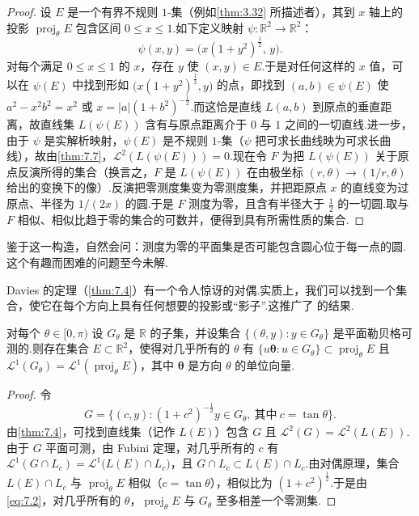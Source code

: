 \begin{proof}
设 $E$ 是一个有界不规则 $1$-集（例如\cref{thm:3.32} 所描述者），其到 $x$ 轴上的投影 $\operatorname{proj}_{\theta}E$ 包含区间 $0\leq x\leq 1$.如下定义映射 $\psi:\mathbb{R}^2\to\mathbb{R}^2$：
\[
  \psi(x,y)=\bigl(x(1+y^{2})^{\frac{1}{2}},\,y\bigr).
\]
对每个满足 $0\leq x\leq 1$ 的 $x$，存在 $y$ 使 $(x,y)\in E$.于是对任何这样的 $x$ 值，可以在 $\psi(E)$ 中找到形如 $\bigl(x(1+y^2)^{\frac{1}{2}},y\bigr)$ 的点，即找到 $(a,b)\in\psi(E)$ 使 $a^2-x^2b^2=x^2$ 或 $x=|a|(1+b^2)^{-\frac{1}{2}}$.而这恰是直线 $L(a,b)$ 到原点的垂直距离，故直线集 $L(\psi(E))$ 含有与原点距离介于 $0$ 与 $1$ 之间的一切直线.进一步，由于 $\psi$ 是实解析映射，$\psi(E)$ 是不规则 $1$-集（$\psi$ 把可求长曲线映为可求长曲线），故由\cref{thm:7.7}，$\mathscr{L}^2(L(\psi(E)))=0$.现在令 $F$ 为把 $L(\psi(E))$ 关于原点反演所得的集合（换言之，$F$ 是 $L(\psi(E))$ 在由极坐标 $(r,\theta)\to(1/r,\theta)$ 给出的变换下的像）.反演把零测度集变为零测度集，并把距原点 $x$ 的直线变为过原点、半径为 $1/(2x)$ 的圆.于是 $F$ 测度为零，且含有半径大于 $\frac{1}{2}$ 的一切圆.取与 $F$ 相似、相似比趋于零的集合的可数并，便得到具有所需性质的集合.
\end{proof}

鉴于这一构造，自然会问：测度为零的平面集是否可能包含圆心位于每一点的圆.这个有趣而困难的问题至今未解.

Davies 的定理（\cref{thm:7.4}）有一个令人惊讶的对偶.实质上，我们可以找到一个集合，使它在每个方向上具有任何想要的投影或``影子''.这推广了 \textcite{talagrand1980} 的结果.

\begin{theorem}\label{thm:7.11}
对每个 $\theta\in[0,\pi)$ 设 $G_\theta$ 是 $\mathbb{R}$ 的子集，并设集合 $\{(\theta,y):y\in G_\theta\}$ 是平面勒贝格可测的.则存在集合 $E\subset\mathbb{R}^2$，使得对几乎所有的 $\theta$ 有 $\{u\boldsymbol{\theta}:u\in G_\theta\}\subset\operatorname{proj}_{\theta}E$ 且 $\mathscr{L}^1(G_\theta)=\mathscr{L}^1(\operatorname{proj}_{\theta}E)$，其中 $\boldsymbol{\theta}$ 是方向 $\theta$ 的单位向量.
\end{theorem}

\begin{proof}
令
\begin{equation}\label{eq:7.2}
  G=\bigl\{(c,y):(1+c^{2})^{-\frac{1}{2}}y\in G_{\theta},\ \text{其中}\ c=\tan\theta\bigr\}.
\end{equation}
由\cref{thm:7.4}，可找到直线集（记作 $L(E)$）包含 $G$ 且 $\mathscr{L}^2(G)=\mathscr{L}^2(L(E))$.由于 $G$ 平面可测，由 Fubini 定理，对几乎所有的 $c$ 有 $\mathscr{L}^1(G\cap L_c)=\mathscr{L}^1\bigl(L(E)\cap L_c\bigr)$，且 $G\cap L_c\subset L(E)\cap L_c$.由对偶原理，集合 $L(E)\cap L_c$ 与 $\operatorname{proj}_{\theta}E$ 相似（$c=\tan\theta$），相似比为 $(1+c^2)^{\frac{1}{2}}$.于是由 \eqref{eq:7.2}，对几乎所有的 $\theta$，$\operatorname{proj}_{\theta}E$ 与 $G_\theta$ 至多相差一个零测集.
\end{proof}

